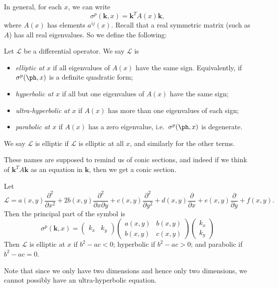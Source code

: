\documentclass[a4paper]{article}
\begin{document}
In general, for each $x$, we can write
\[
  \sigma^p (\mathbf{k}, x) = \mathbf{k}^T A(x)\mathbf{k},
\]
where $A(x)$ has elements $a^{ij}(x)$. Recall that a real symmetric matrix (such as $A$) has all real eigenvalues. So we define the following:

\begin{defi}
  Let $\mathcal{L}$ be a differential operator. We say $\mathcal{L}$ is
  \begin{itemize}
    \item \emph{elliptic at $x$} if all eigenvalues of $A(x)$ have the same sign. Equivalently, if $\sigma^p(\ph, x)$ is a definite quadratic form;
    \item \emph{hyperbolic at $x$} if all but one eigenvalues of $A(x)$ have the same sign;
    \item \emph{ultra-hyperbolic at $x$} if $A(x)$ has more than one eigenvalues of each sign;
    \item \emph{parabolic at $x$} if $A(x)$ has a zero eigenvalue, i.e.\ $\sigma^p(\ph, x)$ is degenerate.
  \end{itemize}
  We say $\mathcal{L}$ is elliptic if $\mathcal{L}$ is elliptic at all $x$, and similarly for the other terms.
\end{defi}
These names are supposed to remind us of conic sections, and indeed if we think of $\mathbf{k}^T A\mathbf{k}$ as an equation in $\mathbf{k}$, then we get a conic section.

\begin{eg}
  Let
  \[
    \mathcal{L} = a(x, y) \frac{\partial^2}{\partial x^2} + 2b(x, y) \frac{\partial^2}{\partial x \partial y} + c(x, y) \frac{\partial^2}{\partial y^2} + d(x, y) \frac{\partial}{\partial x} + e(x, y) \frac{\partial}{\partial y} + f(x, y).
  \]
  Then the principal part of the symbol is
  \[
    \sigma^p(\mathbf{k}, x) =
    \begin{pmatrix}
      k_x & k_y
    \end{pmatrix}
    \begin{pmatrix}
      a(x, y) & b(x, y)\\
      b(x, y) & c(x, y)
    \end{pmatrix}
    \begin{pmatrix}
      k_x \\ k_y
    \end{pmatrix}
  \]
  Then $\mathcal{L}$ is elliptic at $x$ if $b^2 - ac < 0$; hyperbolic if $b^2 - ac > 0$; and parabolic if $b^2 - ac = 0$.

  Note that since we only have two dimensions and hence only two dimensions, we cannot possibly have an ultra-hyperbolic equation.
\end{eg}
\end{document}
